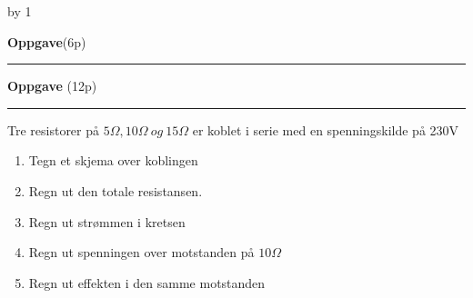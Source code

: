 \documentclass[12pt,a4paper]{article}
\def\oppgave{
            \advance\questnum by 1
	    \ifthenelse{\questnum>0\AND \questnum<9}
	    {
                \vskip 1cm
		\textbf{Oppgave}\hskip 5pt\the\questnum \hfill \hfill(6p)
		\vskip 3pt
		\hrule
	\vskip 0.5cm}
	{
                \vskip 1cm
		\textbf{Oppgave}\hskip 5pt \the\questnum \hfill \hfill(12p)
		\vskip 3pt \hrule \vskip 0.5cm }

		}
\begin{document}
\vskip 5pt 
\vskip 2.5pt 
\newpage
\oppgave{}%
\vskip 2.5pt 
Tre resistorer på $5\Omega, 10\Omega\  og\  15\Omega$ er koblet i serie med en spenningskilde på 230V
\begin{enumerate}
	\item Tegn et skjema over koblingen
	\item Regn ut den totale resistansen. 
	\item Regn ut strømmen i kretsen
	\item Regn ut spenningen over motstanden på $10\Omega$
	\item Regn ut effekten i den samme motstanden
\end{enumerate}
\vskip 5pt 
\vskip 2.5pt 
\newpage
\end{document}
